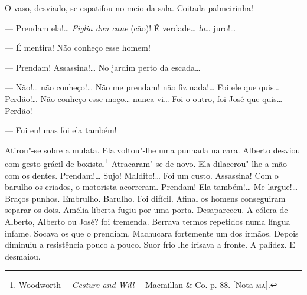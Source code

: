 O vaso, desviado, se espatifou no meio da sala. Coitada palmeirinha!

--- Prendam ela!\ldots{} \emph{Figlia dun cane} (cão)! É verdade\ldots{}
\emph{lo}\ldots{} juro!\ldots{}

--- É mentira! Não conheço esse homem!

--- Prendam! Assassina!\ldots{} No jardim perto da escada\ldots{}

--- Não!\ldots{} não conheço!\ldots{} Não me prendam! não fiz nada!\ldots{} Foi ele que
quis\ldots{} Perdão!\ldots{} Não conheço esse moço\ldots{} nunca vi\ldots{} Foi o outro, foi
José que quis\ldots{} Perdão!

--- Fui eu! mas foi ela também!

Atirou"-se sobre a mulata. Ela voltou"-lhe uma punhada na cara. Alberto
desviou com gesto grácil de boxista.\footnote{Woodworth --~\emph{Gesture
  and Will}~-- Macmillan \& Co. p. 88. {[}Nota \textsc{ma}{]}.} Atracaram"-se de
novo. Ela dilacerou"-lhe a mão com os dentes. Prendam!\ldots{} Sujo!
Maldito!\ldots{} Foi um custo. Assassina! Com o barulho os criados, o
motorista acorreram. Prendam! Ela também!\ldots{} Me largue!\ldots{} Braços
punhos. Embrulho. Barulho. Foi difícil. Afinal os homens conseguiram
separar os dois. Amélia liberta fugiu por uma porta. Desapareceu. A
cólera de Alberto, Alberto ou José? foi tremenda. Berrava termos
repetidos numa língua infame. Socava os que o prendiam. Machucara
fortemente um dos irmãos. Depois diminuiu a resistência pouco a pouco.
Suor frio lhe irisava a fronte. A palidez. E desmaiou.

